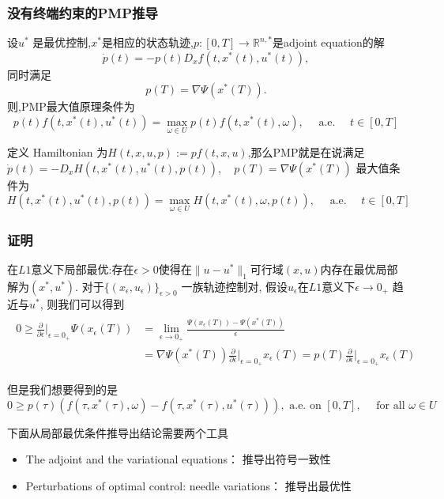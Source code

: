 \documentclass[UTF8, aspectratio=169, 9pt]{ctexbeamer}
\begin{document}
\begin{frame}
\frametitle{没有终端约束的PMP推导 }
\begin{theorem}
  设$u^*$ 是最优控制,$x^*$是相应的状态轨迹,$p:[0,T] \rightarrow \mathbb{R}^{n,*}$是adjoint equation的解
  $$
  \dot{p}(t)=-p(t) D_{x} f\left(t, x^{*}(t), u^{*}(t)\right),
  $$
  同时满足
  $$
  p(T)=\nabla \Psi\left(x^{*}(T)\right).
  $$
  则,PMP最大值原理条件为
  $$
  p(t) f\left(t, x^{*}(t), u^{*}(t)\right)=\max _{\omega \in U} p(t) f\left(t, x^{*}(t), \omega\right), \quad \text { a.e. } \quad t \in[0, T]
  $$
\end{theorem}
定义 Hamiltonian 为$H(t, x, u, p):=p f(t, x, u)$,那么PMP就是在说满足
$
\dot{p}(t)=-D_{x} H\left(t, x^{*}(t), u^{*}(t), p(t)\right), \quad p(T)=\nabla \Psi\left(x^{*}(T)\right)
$
最大值条件为
$$H\left(t, x^{*}(t), u^{*}(t), p(t)\right)=\max _{\omega \in U} H\left(t, x^{*}(t), \omega, p(t)\right), \quad \text { a.e. } \quad t \in[0, T]
$$
\end{frame}

\begin{frame}
\frametitle{证明 }

  在$L1$意义下局部最优:存在$\epsilon > 0$使得在$\| u - u^* \|_1$可行域$(x,u)$内存在最优局部解为$(x^*, u^*)$.
  对于$\{ (x_{\epsilon}, u_{\epsilon}) \}_{\epsilon > 0 }$ 一族轨迹控制对, 假设$u_{\epsilon}$在$L1$意义下$\epsilon \rightarrow 0_+$ 趋近与$u^*$, 则我们可以得到
  \begin{align*}
  \begin{split}
  0 \ge \frac{\partial}{\partial \epsilon} \bigg |_{\epsilon=0_+} \Psi( x_{\epsilon}(T) ) & = \lim_{\epsilon \to 0_+} \frac{\Psi(x_{\epsilon}(T)) - \Psi( x^*(T) )}{\epsilon} \\
   &= \nabla \Psi(x^*(T)) \frac{\partial}{\partial \epsilon} \bigg |_{\epsilon=0_+} x_{\epsilon}(T) = p(T) \frac{\partial}{\partial \epsilon} \bigg |_{\epsilon=0_+} x_{\epsilon}(T)
  \end{split}
  \end{align*}
  
  但是我们想要得到的是
  $$
  0 \geq p(\tau)\left(f\left(\tau, x^{*}(\tau), \omega\right)-f\left(\tau, x^{*}(\tau), u^{*}(\tau)\right)\right), \text { a.e. on }[0, T], \quad \text { for all } \omega \in U
  $$
  
  下面从局部最优条件推导出结论需要两个工具
  \begin{itemize}
    \item The adjoint and the variational equations：
    推导出符号一致性
    \item Perturbations of optimal control: needle variations：
    推导出最优性
  \end{itemize}
  

\end{frame}
\end{document}
